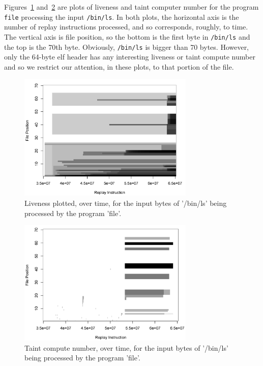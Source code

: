 Figures~\ref{fig:liv-graph} and~\ref{fig:tcn-graph} are plots of liveness and taint computer number for the program \verb+file+ processing the input \verb+/bin/ls+.
In both plots, the horizontal axis is the number of replay instructions processed, and so corresponds, roughly, to time.
The vertical axis is file position, so the bottom is the first byte in \verb+/bin/ls+ and the top is the 70th byte.  
Obviously, \verb+/bin/ls+ is bigger than 70 bytes.  
However, only the 64-byte elf header has any interesting liveness or taint compute number and so we restrict our attention, in these plots, to that portion of the file.

                                                                                                      

\begin{figure}
\centering
\includegraphics[width=3.3in]{liv-graph.png}
\caption{Liveness plotted, over time, for the input bytes of '/bin/ls' being processed by the program 'file'.}
\label{fig:liv-graph}
\end{figure}

\begin{figure}
\centering
\includegraphics*[width=3.3in]{tcn-graph.png}
\caption{Taint compute number, over time, for the input bytes of '/bin/ls' being processed by the program 'file'.}
\label{fig:tcn-graph}
\end{figure}


